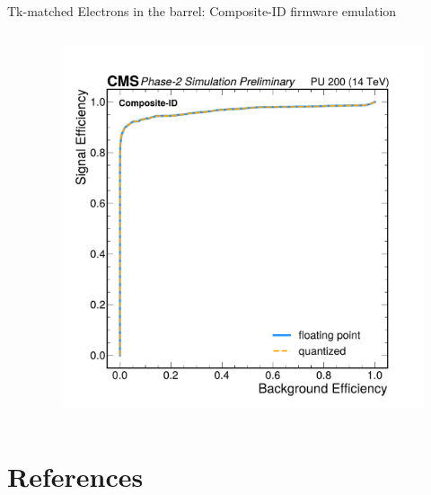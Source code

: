 \documentclass[aspectratio=169]{beamer}\usepackage[utf8]{inputenc}
\begin{document}
\begin{frame}{Tk-matched Electrons in the barrel: Composite-ID firmware emulation}
\begin{columns}[c]
\begin{column}{.6\textwidth}
\begin{minipage}{\textwidth}
\end{minipage}
\end{column}

\begin{column}{.4\textwidth}
\begin{figure}
\centering
    \includegraphics[width=\textwidth]{barrel_figs/rocs.pdf}
\end{figure}


\end{column}

\end{columns}
\end{frame}












\section{References}
\end{document}
